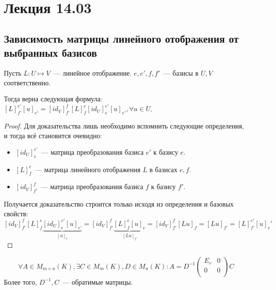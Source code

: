 \section{Лекция 14.03}
\subsection{Зависимость матрицы линейного отображения от выбранных базисов}
\begin{theorem}
    Пусть $L: U\mapsto V$~--- линейное отображение. 
    $e, e', f, f'$~--- базисы в $U, V$ соответственно.

    Тогда верна следующая формула:
		$[L]^{e'}_{f'}[u]_{e'}=[id_V]_{f'}^{f}[L]_f^{e}[id_U]_e^{e'}[u]_{e'}, \forall u\in U$.
\end{theorem}
\begin{proof}
    Для доказательства лишь необходимо вспомнить следующие определения, и тогда всё
    становится очевидно:
    \begin{itemize}
        \item $[id_U]_{e}^{e'}$~--- матрица преобразования базиса $e'$ к базису $e$.
        \item $[L]_f^e$~--- матрица линейного отображения $L$ в базисах $e,f$.
        \item $[id_V]_{f'}^f$~--- матрица преобразования базиса $f$ к базису $f'$.
    \end{itemize}
    Получается доказательство строится только исходя из определения и базовых
    свойств:
    \[
        [id_V]_{f'}^{f}[L]_f^{e}\underbrace{[id_U]_e^{e'}[u]_{e'}}_{[u]_e}=
        [id_V]_{f'}^{f}\underbrace{[L]_f^{e}[u]_e}_{[Lu]_f}=
        [id_V]_{f'}^{f}[Lu]_f=[Lu]_{f'}=[L]^{e'}_{f'}[u]_e'
    \]
\end{proof}
\begin{follow}
    $$\forall A\in M_{m\times n}(K),
    \exists C\in M_m(K), D\in M_n(K)\colon A = D^{-1}
    \left(\begin{array}{c|c}
            E_r & 0\\
            \hline
            0 & 0\\
    \end{array}\right) C$$
    Более того, $D^{-1}, C$~--- обратимые матрицы.
\end{follow}
